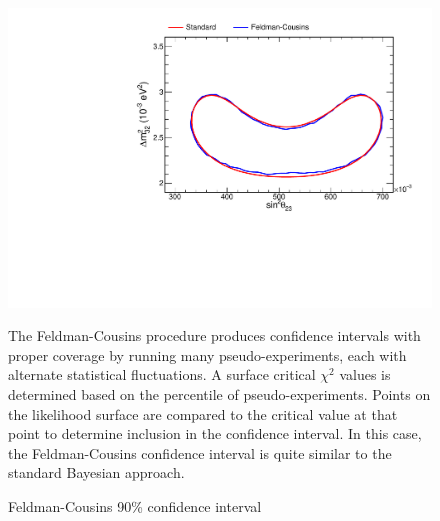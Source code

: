\begin{figure}
\begin{center}
\includegraphics[width=\textwidth]{figures/results/fc_compare.pdf}
\end{center}
\caption{Feldman-Cousins 90\% confidence interval}{
The Feldman-Cousins procedure \cite{feldman1998unified}
produces confidence intervals with proper coverage
by running many pseudo-experiments, each with alternate
statistical fluctuations.
A surface critical $\chi^2$ values is determined based on the
percentile of pseudo-experiments.
Points on the likelihood surface are compared to the critical value
at that point to determine inclusion in the confidence interval.
In this case, the Feldman-Cousins confidence interval is quite similar
to the standard Bayesian approach.
}
\label{measured_contour_fc}

\end{figure}

